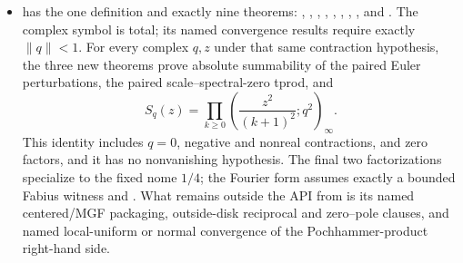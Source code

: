 \documentclass[11pt,a4paper,oneside,openany]{book}
\theoremstyle{definition}
\theoremstyle{remark}
\begin{document}
\begin{itemize}
\item {} has the one definition
 and exactly nine theorems:
,
,
,
,
,
,
,
, and
.  The complex
symbol is total; its named convergence results require exactly
\(\lVert q\rVert<1\).  For every complex \(q,z\) under that same contraction
hypothesis, the three new theorems prove absolute summability of the paired
Euler perturbations, the paired scale--spectral-zero tprod, and
\[
 S_q(z)=\prod_{k\ge0}
 \left(\frac{z^2}{(k+1)^2};q^2\right)_\infty .
\]
This identity includes \(q=0\), negative and nonreal contractions, and zero
factors, and it has no nonvanishing hypothesis.  The final two factorizations
specialize to the fixed nome
\(1/4\); the Fourier form assumes exactly a bounded Fabius witness and
.  What remains outside the API from
 is its named centered/MGF packaging, outside-disk
reciprocal and zero--pole clauses, and named local-uniform or normal
convergence of the Pochhammer-product right-hand side.


\end{itemize}
\end{document}

